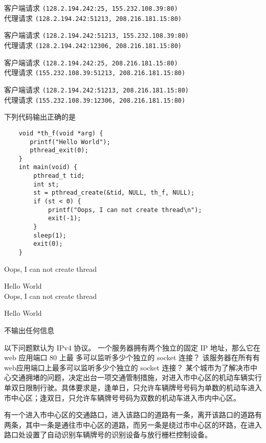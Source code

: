 \begin{problems}
\begin{choices}
            \item 客户端请求 \verb|(128.2.194.242:25, 155.232.108.39:80)| \\ 代理请求 \verb|(128.2.194.242:51213, 208.216.181.15:80)|
            \item 客户端请求 \verb|(128.2.194.242:51213, 155.232.108.39:80)| \\ 代理请求 \verb|(128.2.194.242:12306, 208.216.181.15:80)|
            \item 客户端请求 \verb|(128.2.194.242:25, 208.216.181.15:80)| \\ 代理请求 \verb|(155.232.108.39:51213, 208.216.181.15:80)|
            \item 客户端请求 \verb|(128.2.194.242:51213, 208.216.181.15:80)| \\ 代理请求 \verb|(155.232.108.39:12306, 208.216.181.15:80)|
        \end{choices}
         下列代码输出正确的是
        \begin{verbatim}
    void *th_f(void *arg) {
       printf("Hello World");
       pthread_exit(0);
    }
    int main(void) {
        pthread_t tid;
        int st;
        st = pthread_create(&tid, NULL, th_f, NULL);
        if (st < 0) {
            printf("Oops, I can not create thread\n");
            exit(-1);
        }
        sleep(1);
        exit(0);
    }
        \end{verbatim}
        \begin{choices}
            \item Oops, I can not create thread
            \item Hello World \\ Oops, I can not create thread
            \item Hello World
            \item 不输出任何信息
        \end{choices}
         以下问题默认为 IPv4 协议。
            \qn 一个服务器拥有两个独立的固定 IP 地址，那么它在 web 应用端口 80 上最 多可以监听多少个独立的 socket 连接？
            \qn 该服务器在所有有web应用端口上最多可以监听多少个独立的 socket 连接？
         某个城市为了解决市中心交通拥堵的问题，决定出台一项交通管制措施，对进入市中心区的机动车辆实行单双日限制行驶。具体要求是，逢单日，只允许车辆牌号号码为单数的机动车进入市中心区；逢双日，只允许车辆牌号号码为双数的机动车进入市内中心区。
        
        有一个进入市中心区的交通路口，进入该路口的道路有一条，离开该路口的道路有两条，其中一条是通往市中心区的道路，而另一条是绕过市中心区的环路，在进入路口处设置了自动识别车辆牌号的识别设备与放行栅栏控制设备。
        

\end{problems}
